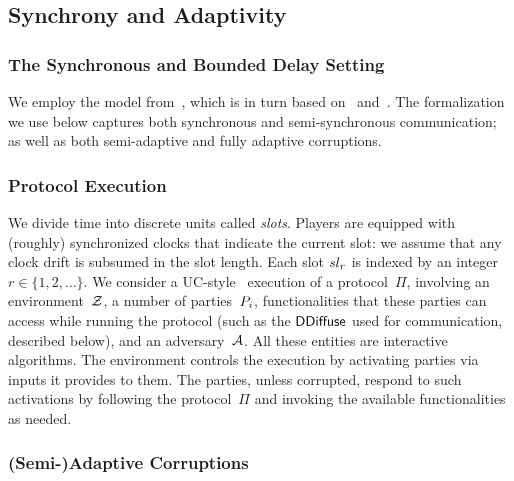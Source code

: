 \subsection{Synchrony and Adaptivity}


\subsubsection{The Synchronous and Bounded Delay Setting}

We employ the model from~\cite{EC:DGKR18}, which is in turn based
on~\cite{C:KRDO17} and~\cite{EC:GarKiaLeo15}.
The formalization we use below captures both synchronous and semi-syn\-chronous
communication; as well as both semi-adaptive and fully adaptive corruptions.

\subsubsection{Protocol Execution}
\label{sec:prelim-exec}

We divide time into discrete units called
\emph{slots}. %
Players are equipped with (roughly) synchronized clocks that
indicate the current slot: we assume that any clock drift is subsumed in the
slot length.  Each slot $sl_r$ is indexed by an integer $r \in \{1,2,\ldots
\}$.
We consider a UC-style~\cite{FOCS:Canetti01} execution of a protocol~$\Pi$,
involving an environment~$\mathcal{Z}$, a number of
parties~$P_i$, functionalities that these parties can access while running
the protocol (such as the $\mathsf{DDiffuse}$ used for communication, described below), and
an adversary~$\mathcal{A}$. All these entities are interactive algorithms.  The
environment controls the execution by activating parties via inputs it provides
to them. The parties, unless corrupted, respond to such activations by following
the protocol~$\Pi$ and invoking the available functionalities as needed.

\subsubsection{(Semi-)Adaptive Corruptions}
\label{sec:prelim-corr}


